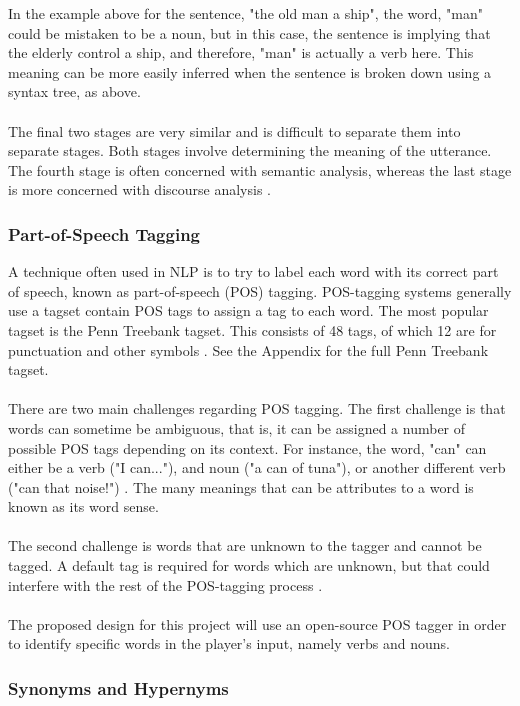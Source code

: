 \documentclass[12pt]{article}
\begin{document}
In the example above for the sentence, "the old man a ship", the word, "man" could be mistaken to be a noun, but in this case, the sentence is implying that the elderly control a ship, and therefore, "man" is actually a verb here. This meaning can be more easily inferred when the sentence is broken down using a syntax tree, as above.
\\
\\
The final two stages are very similar and is difficult to separate them into separate stages. Both stages involve determining the meaning of the utterance. The fourth stage is often concerned with semantic analysis, whereas the last stage is more concerned with discourse analysis \cite{RefWorks:39}.

\subsubsection{Part-of-Speech Tagging}

A technique often used in NLP is to try to label each word with its correct part of speech, known as part-of-speech (POS) tagging. POS-tagging systems generally use a tagset contain POS tags to assign a tag to each word. The most popular tagset is the Penn Treebank tagset. This consists of 48 tags, of which 12 are for punctuation and other symbols \cite{RefWorks:41}. See the Appendix for the full Penn Treebank tagset.
\\
\\
There are two main challenges regarding POS tagging. The first challenge is that words can sometime be ambiguous, that is, it can be assigned a number of possible POS tags depending on its context. For instance, the word, "can" can either be a verb ("I can..."), and noun ("a can of tuna"), or another different verb ("can that noise!") \cite{RefWorks:43}. The many meanings that can be attributes to a word is known as its word sense.
\\
\\
The second challenge is words that are unknown to the tagger and cannot be tagged. A default tag is required for words which are unknown, but that could interfere with the rest of the POS-tagging process \cite{RefWorks:41}.
\\
\\
The proposed design for this project will use an open-source POS tagger in order to identify specific words in the player's input, namely verbs and nouns.

\subsubsection{Synonyms and Hypernyms}
\end{document}
